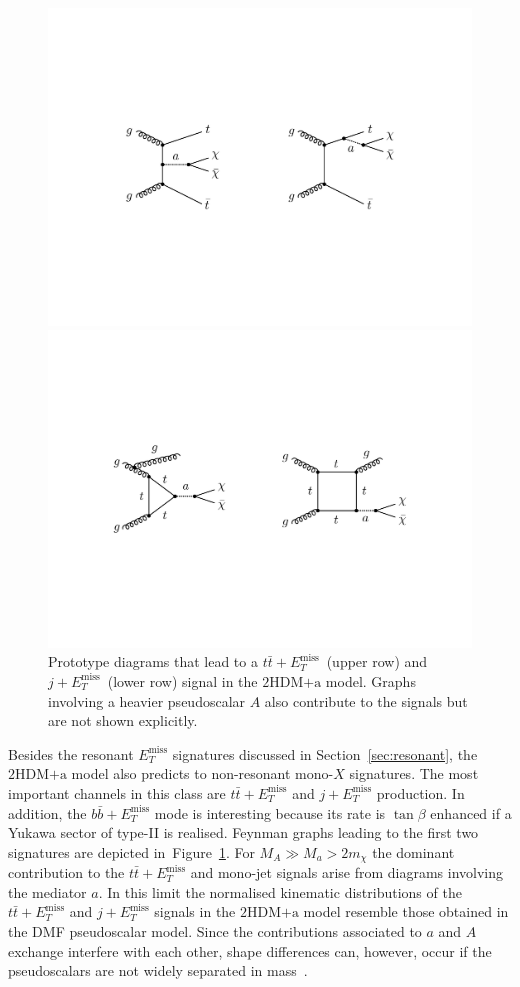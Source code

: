 \documentclass[a4paper, 11pt,notoc]{article}
\newcommand{\MET}{\ensuremath{E_T^\mathrm{miss}}\xspace}
\newcommand{\hdma}{\ensuremath{\textrm{2HDM+a}}\xspace}
\begin{document}
\begin{figure}[t!]
\centering
\includegraphics[width=.725\textwidth]{ttmet.pdf}

\vspace{7mm}

\includegraphics[width=.8\textwidth]{jmet.pdf}

\vspace{4mm}
\caption{\label{fig:nonresonant} Prototype diagrams that lead  to a $t \bar t+\MET$~(upper row) and $j+\MET$~(lower row) signal in the \hdma model. Graphs involving a heavier pseudoscalar $A$ also contribute to the signals but are not shown explicitly.}
\end{figure}

Besides the resonant $\MET$ signatures discussed in Section~\ref{sec:resonant}, the   \hdma model also predicts to non-resonant mono-$X$ signatures. The most important channels in this class are $t \bar t +\MET$ and $j+\MET$ production. In addition, the $b \bar b +\MET$ mode is interesting because its rate is $\tan \beta$ enhanced if a Yukawa sector of  type-II is realised.  Feynman graphs leading to the first two signatures are depicted in~Figure~\ref{fig:nonresonant}. For $M_A \gg M_a > 2 m_\chi$ the dominant contribution to the  $t \bar t +\MET$ and mono-jet signals arise from diagrams involving the  mediator $a$. In this limit the normalised kinematic distributions of the $t \bar t + \MET$ and $j+\MET$ signals in the \hdma model resemble those obtained in the DMF pseudoscalar   model. Since the contributions  associated to $a$ and $A$ exchange interfere with each other, shape differences can, however, occur if the pseudoscalars are not widely separated in mass~\cite{Bauer:2017ota}.
\end{document}
